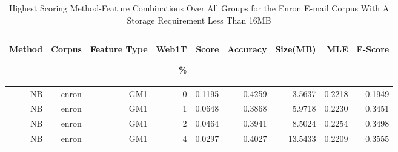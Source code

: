 \begin{table}[htbp!]
	\begin{center}
		\begin{tabular}{ | r | r | r | r | r | r | r | r | r |}
			\hline
			\begin{sideways}Method\end{sideways} & \begin{sideways}Corpus\end{sideways} & \begin{sideways}Feature Type\end{sideways} & \begin{sideways}Web1T\end{sideways} \% & \begin{sideways}Score\end{sideways} & \begin{sideways}Accuracy\end{sideways} & \begin{sideways}Size(MB)\end{sideways} &\begin{sideways}MLE\end{sideways} & \begin{sideways}F-Score\end{sideways}\\ \hline

NB	& enron	& GM1	& 0	& 0.1195	& 0.4259	& 3.5637	& 0.2218	& 0.1949\\ \hline 
NB	& enron	& GM1	& 1	& 0.0648	& 0.3868	& 5.9718	& 0.2230	& 0.3451\\ \hline 
NB	& enron	& GM1	& 2	& 0.0464	& 0.3941	& 8.5024	& 0.2254	& 0.3498\\ \hline 
NB	& enron	& GM1	& 4	& 0.0297	& 0.4027	& 13.5433	& 0.2209	& 0.3555\\ \hline

\end{tabular}
		\caption{Highest Scoring Method-Feature Combinations Over All Groups for the Enron E-mail Corpus With A Storage Requirement Less Than 16MB}
		\label{tab:top_enron_by_score_all_groups_under_16mb}
	\end{center}
\end{table}

